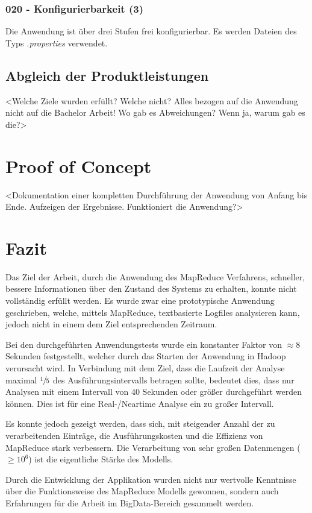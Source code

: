  \subsubsection{020 - Konfigurierbarkeit (3)}
 Die Anwendung ist über drei Stufen frei konfigurierbar. Es werden Dateien des Typs \textit{.properties} verwendet. 

\subsection{Abgleich der Produktleistungen}


<Welche Ziele wurden erfüllt? Welche nicht? Alles bezogen auf die Anwendung nicht auf die Bachelor Arbeit! Wo gab es Abweichungen? Wenn ja, warum gab es die?>

\section{Proof of Concept}
<Dokumentation einer kompletten Durchführung der Anwendung von Anfang bis Ende. Aufzeigen der Ergebnisse. Funktioniert die Anwendung?>

\section{Fazit}\label{sec:Fazit}
Das Ziel der Arbeit, durch die Anwendung des MapReduce Verfahrens, schneller, bessere Informationen über den Zustand des Systems zu erhalten, konnte nicht vollständig erfüllt werden. Es wurde zwar eine prototypische Anwendung geschrieben, welche, mittels MapReduce, textbasierte Logfiles analysieren kann, jedoch nicht in einem dem Ziel entsprechenden Zeitraum.

Bei den durchgeführten Anwendungstests wurde ein konstanter Faktor von $\approx 8$ Sekunden festgestellt, welcher durch das Starten der Anwendung in Hadoop verursacht wird. In Verbindung mit dem Ziel, dass die Laufzeit der Analyse maximal $\sfrac{1}{5}$ des Ausführungsintervalls betragen sollte, bedeutet dies, dass nur Analysen mit einem Intervall von 40 Sekunden oder größer durchgeführt werden können. Dies ist für eine Real-/Neartime Analyse ein zu großer Intervall.

Es konnte jedoch gezeigt werden, dass sich, mit steigender Anzahl der zu verarbeitenden Einträge, die Ausführungskosten und die Effizienz von MapReduce stark verbessern. Die Verarbeitung von sehr großen Datenmengen ($\geq10^6$) ist die eigentliche Stärke des Modells.

Durch die Entwicklung der Applikation wurden nicht nur wertvolle Kenntnisse über die Funktionsweise des MapReduce Modells gewonnen, sondern auch Erfahrungen für die Arbeit im BigData-Bereich gesammelt werden.

